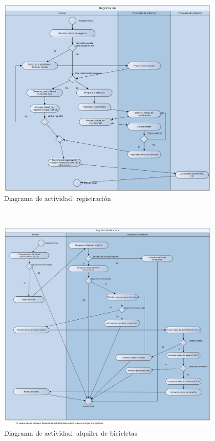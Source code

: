 \begin{figure}[H]
	\centering
	\includegraphics[scale=0.19]{imgs/DA_registracion.png}
	\caption{Diagrama de actividad: registración}
\end{figure}

~

\begin{figure}[H]
	\centering
	\includegraphics[scale=0.19]{imgs/DA_alquiler_de_bici.png}
	\caption{Diagrama de actividad: alquiler de bicicletas}
\end{figure}

